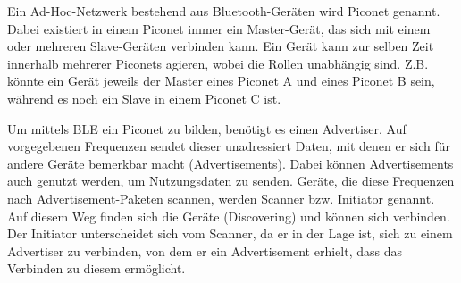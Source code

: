 Ein Ad-Hoc-Netzwerk bestehend aus Bluetooth-Geräten wird Piconet genannt. Dabei existiert in einem Piconet immer ein Master-Gerät, das sich mit einem oder mehreren Slave-Geräten verbinden kann. Ein Gerät kann zur selben Zeit innerhalb mehrerer Piconets agieren, wobei die Rollen unabhängig sind. Z.B. könnte ein Gerät jeweils der Master eines Piconet A und eines Piconet B sein, während es noch ein Slave in einem Piconet C ist.

Um mittels BLE ein Piconet zu bilden, benötigt es einen Advertiser. Auf vorgegebenen Frequenzen sendet dieser unadressiert Daten, mit denen er sich für andere Geräte bemerkbar macht (Advertisements). Dabei können Advertisements auch genutzt werden, um Nutzungsdaten zu senden. Geräte, die diese Frequenzen nach Advertisement-Paketen scannen, werden Scanner bzw. Initiator genannt. Auf diesem Weg finden sich die Geräte (Discovering) und können sich verbinden. Der Initiator unterscheidet sich vom Scanner, da er in der Lage ist, sich zu einem Advertiser zu verbinden, von dem er ein Advertisement erhielt, dass das Verbinden zu diesem ermöglicht.